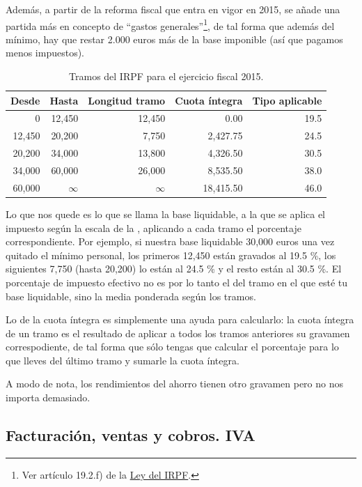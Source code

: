 \documentclass[nochap,palatino,shortheader]{apuntes}
\begin{document}
Además, a partir de la reforma fiscal que entra en vigor en 2015, se añade una partida más en concepto de ``gastos generales''\footnote{Ver artículo 19.2.f) de la \href{https://www.boe.es/buscar/act.php?id=BOE-A-2006-20764&b=29&tn=1&p=20141128}{Ley del IRPF}.}, de tal forma que además del mínimo, hay que restar 2.000 euros más de la base imponible (así que pagamos menos impuestos).

\begin{table}[hbtp]
\centering
\footnotesize
\begin{tabular}{r|r|r|r|r}
\textbf{Desde} & \textbf{Hasta} & \textbf{Longitud tramo} & \textbf{Cuota íntegra} & \textbf{Tipo aplicable} \\ \toprule
0 & 12,450 & 12,450 & 0.00 & 19.5 \\
12,450 & 20,200 & 7,750 & 2,427.75 & 24.5 \\
20,200 & 34,000 & 13,800 & 4,326.50 & 30.5 \\
34,000 & 60,000 & 26,000 & 8,535.50 & 38.0 \\
60,000 & $\infty$ & $\infty$ & 18,415.50 & 46.0 \\
\end{tabular}
\caption{Tramos del IRPF para el ejercicio fiscal 2015.}
\label{tab:Tramos2015IRPF}
\end{table}

Lo que nos quede es lo que se llama la base liquidable, a la que se aplica el impuesto según la escala de la , aplicando a cada tramo el porcentaje correspondiente. Por ejemplo, si nuestra base liquidable 30,000 euros una vez quitado el mínimo personal, los primeros 12,450 están gravados al 19.5 \%, los siguientes 7,750 (hasta 20,200) lo están al 24.5 \% y el resto están al 30.5 \%. El porcentaje de impuesto efectivo no es por lo tanto el del tramo en el que esté tu base liquidable, sino la media ponderada según los tramos.

Lo de la cuota íntegra es simplemente una ayuda para calcularlo: la cuota íntegra de un tramo es el resultado de aplicar a todos los tramos anteriores su gravamen correspodiente, de tal forma que sólo tengas que calcular el porcentaje para lo que lleves del último tramo y sumarle la cuota íntegra.

A modo de nota, los rendimientos del ahorro tienen otro gravamen pero no nos importa demasiado.

\subsection{Facturación, ventas y cobros. IVA}
\end{document}
